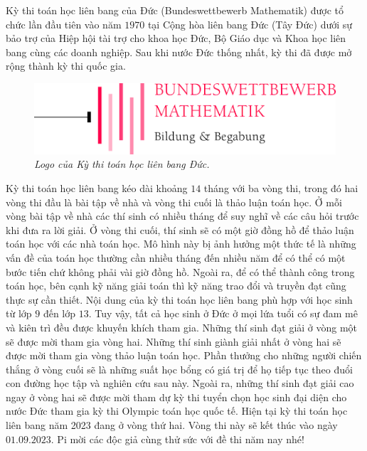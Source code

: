 \begin{multicols}{2}
	Kỳ thi toán học liên bang của Đức (Bundeswettbewerb Mathematik) được tổ chức lần đầu tiên vào năm $1970$ tại Cộng hòa liên bang Đức (Tây Đức) dưới sự bảo trợ của Hiệp hội tài trợ cho khoa học Đức, Bộ Giáo dục và Khoa học liên bang cùng các doanh nghiệp. Sau khi nước Đức thống nhất, kỳ thi đã được mở rộng thành kỳ thi quốc gia. 
	\begin{figure}[H]
		\vspace*{-5pt}
		\centering
		\captionsetup{labelformat= empty, justification=centering}
		\includegraphics[width= 1\linewidth]{2}
		\caption{\small\textit{\color{cackithi}Logo của Kỳ thi toán học liên bang Đức.}}
		\vspace*{-10pt}
	\end{figure}
	Kỳ thi toán học liên bang kéo dài khoảng $14$ tháng với ba vòng thi, trong đó hai vòng thi đầu là bài tập về nhà và vòng thi cuối là thảo luận toán học. Ở mỗi vòng bài tập về nhà các thí sinh có nhiều tháng để suy nghĩ về các câu hỏi trước khi đưa ra lời giải. Ở vòng thi cuối, thí sinh sẽ có một giờ đồng hồ để thảo luận toán học với các nhà toán học. Mô hình này bị ảnh hưởng một thức tế là những vấn đề của toán học thường cần nhiều tháng đến nhiều năm để có thể có một bước tiến chứ không phải vài giờ đồng hồ. Ngoài ra, để có thể thành công trong toán học, bên cạnh kỹ năng giải toán thì kỹ năng trao đổi và truyền đạt cũng thực sự cần thiết. 
	\vskip 0.1cm
	Nội dung của kỳ thi toán học liên bang phù hợp với học sinh từ lớp $9$ đến lớp $13$. Tuy vậy, tất cả học sinh ở Đức ở mọi lứa tuổi có sự đam mê và kiên trì đều được khuyến khích tham gia. Những thí sinh đạt giải ở vòng một sẽ được mời tham gia vòng hai. Những thí sinh giành giải nhất ở vòng hai sẽ được mời tham gia vòng thảo luận toán học. Phần thưởng cho những người chiến thắng ở vòng cuối sẽ là những suất học bổng có giá trị để họ tiếp tục theo đuổi con đường học tập và nghiên cứu sau này. Ngoài ra, những thí sinh đạt giải cao ngay ở vòng hai sẽ được mời tham dự kỳ thi tuyển chọn học sinh đại diện cho nước Đức tham gia kỳ thi Olympic toán học quốc tế.
	\vskip 0.1cm
	Hiện tại kỳ thi toán học liên bang năm 2023 đang ở vòng thứ hai. Vòng thi này sẽ kết thúc vào ngày $01.09.2023$. Pi mời các độc giả cùng thử sức với đề thi năm nay nhé!

\end{multicols}
